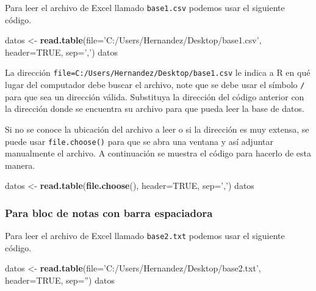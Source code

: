 \documentclass[10pt,]{krantz}
\makeatletter
\newenvironment{Shaded}{\begin{snugshade}}{\end{snugshade}}
\newcommand{\KeywordTok}[1]{\textcolor[rgb]{0.13,0.29,0.53}{\textbf{#1}}}
\newcommand{\DataTypeTok}[1]{\textcolor[rgb]{0.13,0.29,0.53}{#1}}
\newcommand{\StringTok}[1]{\textcolor[rgb]{0.31,0.60,0.02}{#1}}
\newcommand{\OtherTok}[1]{\textcolor[rgb]{0.56,0.35,0.01}{#1}}
\newcommand{\NormalTok}[1]{#1}
\newenvironment{kframe}{%
\medskip{}
\setlength{\fboxsep}{.8em}
 \def\at@end@of@kframe{}%
 \ifinner\ifhmode%
  \def\at@end@of@kframe{\end{minipage}}%
  \begin{minipage}{\columnwidth}%
 \fi\fi%
 \def\FrameCommand##1{\hskip\@totalleftmargin \hskip-\fboxsep
 \colorbox{shadecolor}{##1}\hskip-\fboxsep
     \hskip-\linewidth \hskip-\@totalleftmargin \hskip\columnwidth}%
 \MakeFramed {\advance\hsize-\width
   \@totalleftmargin\z@ \linewidth\hsize
   \@setminipage}}%
 {\par\unskip\endMakeFramed%
 \at@end@of@kframe}
\renewenvironment{Shaded}{\begin{kframe}}{\end{kframe}}
\makeatother
\begin{document}
Para leer el archivo de Excel llamado \texttt{base1.csv} podemos usar el
siguiente código.

\begin{Shaded}
\begin{Highlighting}[]
\NormalTok{datos <-}\StringTok{ }\KeywordTok{read.table}\NormalTok{(}\DataTypeTok{file=}\StringTok{'C:/Users/Hernandez/Desktop/base1.csv'}\NormalTok{,}
                    \DataTypeTok{header=}\OtherTok{TRUE}\NormalTok{, }\DataTypeTok{sep=}\StringTok{','}\NormalTok{)}
\NormalTok{datos}
\end{Highlighting}
\end{Shaded}

La dirección
\texttt{file=\textquotesingle{}C:/Users/Hernandez/Desktop/base1.csv\textquotesingle{}}
le indica a R en qué lugar del computador debe buscar el archivo, note
que se debe usar el símbolo \texttt{/} para que sea un dirección válida.
Substituya la dirección del código anterior con la dirección donde se
encuentra su archivo para que pueda leer la base de datos.

Si no se conoce la ubicación del archivo a leer o si la dirección es muy
extensa, se puede usar \texttt{file.choose()} para que se abra una
ventana y así adjuntar manualmente el archivo. A continuación se muestra
el código para hacerlo de esta manera.

\begin{Shaded}
\begin{Highlighting}[]
\NormalTok{datos <-}\StringTok{ }\KeywordTok{read.table}\NormalTok{(}\KeywordTok{file.choose}\NormalTok{(), }\DataTypeTok{header=}\OtherTok{TRUE}\NormalTok{, }\DataTypeTok{sep=}\StringTok{','}\NormalTok{)}
\NormalTok{datos}
\end{Highlighting}
\end{Shaded}

\subsubsection*{Para bloc de notas con barra
espaciadora}\label{para-bloc-de-notas-con-barra-espaciadora}

Para leer el archivo de Excel llamado \texttt{base2.txt} podemos usar el
siguiente código.

\begin{Shaded}
\begin{Highlighting}[]
\NormalTok{datos <-}\StringTok{ }\KeywordTok{read.table}\NormalTok{(}\DataTypeTok{file=}\StringTok{'C:/Users/Hernandez/Desktop/base2.txt'}\NormalTok{,}
                    \DataTypeTok{header=}\OtherTok{TRUE}\NormalTok{, }\DataTypeTok{sep=}\StringTok{''}\NormalTok{)}
\NormalTok{datos}
\end{Highlighting}
\end{Shaded}
\end{document}
